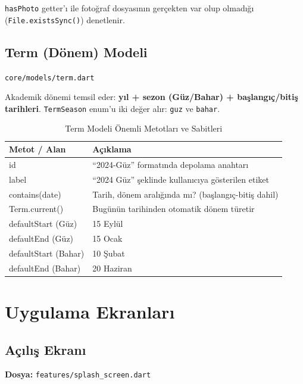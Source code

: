 \documentclass[12pt,a4paper]{article}
\begin{document}
\texttt{hasPhoto} getter'ı ile fotoğraf dosyasının gerçekten var olup olmadığı (\texttt{File.existsSync()}) denetlenir.

\subsection{Term (Dönem) Modeli}
\texttt{core/models/term.dart}

Akademik dönemi temsil eder: \textbf{yıl + sezon (Güz/Bahar) + başlangıç/bitiş tarihleri}. \texttt{TermSeason} enum'u iki değer alır: \texttt{guz} ve \texttt{bahar}.

\begin{table}[H]
    \centering
    \caption{Term Modeli Önemli Metotları ve Sabitleri}
    \label{tab:term}
    \renewcommand{\arraystretch}{1.3}
    \begin{tabularx}{\textwidth}{>{\ttfamily}l X}
        \toprule
        \normalfont\textbf{Metot / Alan} & \textbf{Açıklama} \\
        \midrule
        id               & ``2024-Güz'' formatında depolama anahtarı \\
        label            & ``2024 Güz'' şeklinde kullanıcıya gösterilen etiket \\
        contains(date)   & Tarih, dönem aralığında mı? (başlangıç-bitiş dahil) \\
        Term.current()   & Bugünün tarihinden otomatik dönem türetir \\
        defaultStart (Güz)   & 15 Eylül \\
        defaultEnd (Güz)     & 15 Ocak \\
        defaultStart (Bahar) & 10 Şubat \\
        defaultEnd (Bahar)   & 20 Haziran \\
        \bottomrule
    \end{tabularx}
\end{table}

\section{Uygulama Ekranları}

\subsection{Açılış Ekranı}
\textbf{Dosya:} \texttt{features/splash\_screen.dart}
\end{document}
